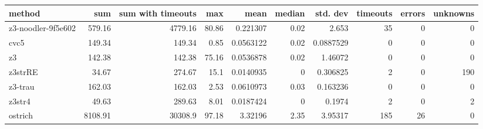 \begin{tabular}{lrrrrrrrrr}
\hline
 method             &     sum &   sum with timeouts &   max &      mean &   median &   std. dev &   timeouts &   errors &   unknowns \\
\hline
 z3-noodler-9f5e602 &  579.16 &             4779.16 & 80.86 & 0.221307  &     0.02 &  2.653     &         35 &        0 &          0 \\
 cvc5               &  149.34 &              149.34 &  0.85 & 0.0563122 &     0.02 &  0.0887529 &          0 &        0 &          0 \\
 z3                 &  142.38 &              142.38 & 75.16 & 0.0536878 &     0.02 &  1.46072   &          0 &        0 &          0 \\
 z3strRE            &   34.67 &              274.67 & 15.1  & 0.0140935 &     0    &  0.306825  &          2 &        0 &        190 \\
 z3-trau            &  162.03 &              162.03 &  2.53 & 0.0610973 &     0.03 &  0.163236  &          0 &        0 &          0 \\
 z3str4             &   49.63 &              289.63 &  8.01 & 0.0187424 &     0    &  0.1974    &          2 &        0 &          2 \\
 ostrich            & 8108.91 &            30308.9  & 97.18 & 3.32196   &     2.35 &  3.95317   &        185 &       26 &          0 \\
\hline
\end{tabular}

